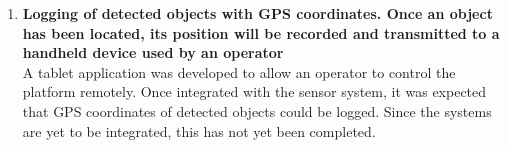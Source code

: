 \documentclass[main.tex]{subfiles}
\begin{document}
\begin{enumerate}
\item \textbf{Logging of detected objects with GPS coordinates. Once an object has been located, its position will be recorded and transmitted to a handheld device used by an operator}\\ 
A tablet application was developed to allow an operator to control the platform remotely. Once integrated with the sensor system, it was expected that GPS coordinates of detected objects could be logged. Since the systems are yet to be integrated, this has not yet been completed.  
\end{enumerate}
\end{document}
